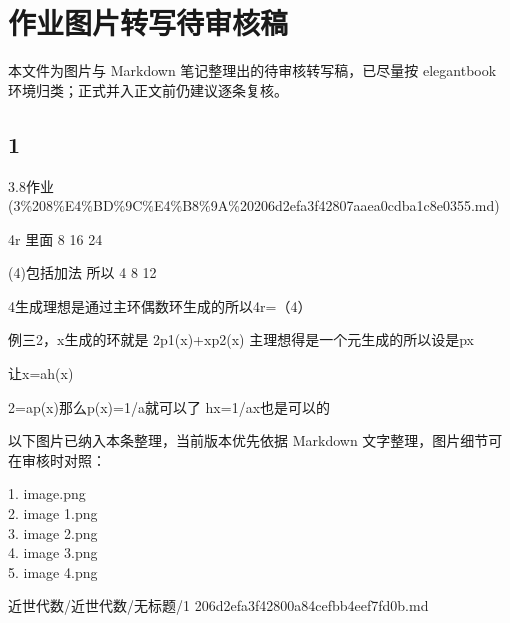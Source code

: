 \chapter{作业图片转写待审核稿}

\begin{dxtips}

本文件为图片与 Markdown 笔记整理出的待审核转写稿，已尽量按 elegantbook 环境归类；正式并入正文前仍建议逐条复核。

\end{dxtips}

\section*{1}

\begin{note}[来源上级主题]

3.8作业 (3\%208\%E4\%BD\%9C\%E4\%B8\%9A\%20206d2efa3f42807aaea0cdba1c8e0355.md)

\end{note}

\begin{homework}

4r 里面 8 16 24

(4)包括加法 所以 4 8 12

4生成理想是通过主环偶数环生成的所以4r=（4）

例三2，x生成的环就是 2p1(x)+xp2(x) 主理想得是一个元生成的所以设是px

让x=ah(x)

2=ap(x)那么p(x)=1/a就可以了 hx=1/ax也是可以的

\end{homework}

\begin{note}[关联图片]
以下图片已纳入本条整理，当前版本优先依据 Markdown 文字整理，图片细节可在审核时对照：

1. image.png\\
2. image 1.png\\
3. image 2.png\\
4. image 3.png\\
5. image 4.png\\

\end{note}

\begin{note}[来源路径]

近世代数/近世代数/无标题/1 206d2efa3f42800a84cefbb4eef7fd0b.md

\end{note}

